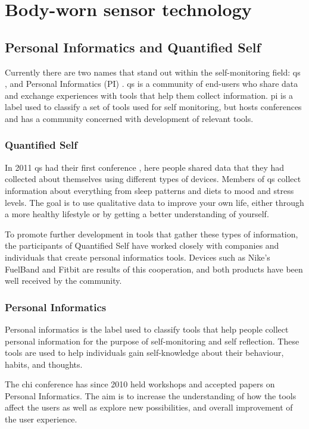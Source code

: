 \chapter{Body-worn sensor technology}

\section{Personal Informatics and Quantified Self}
Currently there are two names that stand out within the self-monitoring field: \gls{qs} \cite{quantifiedSelf}, and Personal Informatics (PI) \cite{personalInformatics}. \gls{qs} is a community of end-users who share data and exchange experiences with tools that help them collect information. \gls{pi} is a label used to classify a set of tools used for self monitoring, but hosts conferences and has a community concerned with development of relevant tools.

\subsection{Quantified Self}
In 2011 \gls{qs} had their first conference \cite{bodyHackers}, here people shared data that they had collected about themselves using different types of devices. Members of \gls{qs} collect information about everything from sleep patterns and diets to mood and stress levels. The goal is to use qualitative data to improve your own life, either through a more healthy lifestyle or by getting a better understanding of yourself. 

To promote further development in tools that gather these types of information, the participants of Quantified Self have worked closely with companies and individuals that create personal informatics tools. Devices such as Nike's FuelBand and Fitbit are results of this cooperation, and both products have been well received by the community.

\subsection{Personal Informatics}
Personal informatics is the label used to classify tools that help people collect personal information for the purpose of self-monitoring and self reflection. These tools are used to help individuals gain self-knowledge about their behaviour, habits, and thoughts.

The \gls{chi} conference has since 2010 \cite{chi2010} held workshops and accepted papers on Personal Informatics. The aim is to increase the understanding of how the tools affect the users as well as explore new possibilities, and overall improvement of the user experience.

